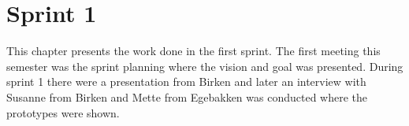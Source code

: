 \chapter{Sprint 1}
This chapter presents the work done in the first sprint.
The first meeting this semester was the sprint planning where the vision and goal was presented.
During sprint 1 there were a presentation from Birken and later an interview with Susanne from Birken and Mette from Egebakken was conducted where the prototypes were shown. 


